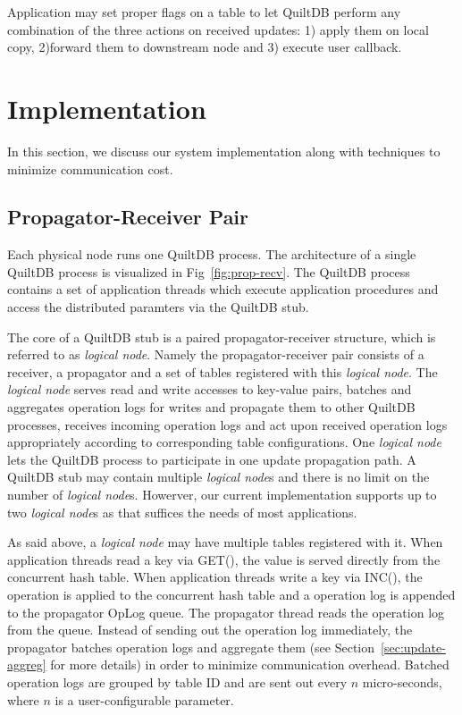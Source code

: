 \documentclass{acm_proc_article-sp}
\begin{document}
Application may set proper flags on a table to let QuiltDB perform any 
combination of the three actions on received updates: 1) apply them on local 
copy, 2)forward them to downstream node and 3) execute user callback.

\section{Implementation}
In this section, we discuss our system implementation along with techniques to 
minimize communication cost.

\subsection{Propagator-Receiver Pair}

Each physical node runs one QuiltDB process. The architecture of a single 
QuiltDB process is visualized in Fig~\ref{fig:prop-recv}.  The QuiltDB process
contains a set of application threads which execute application procedures and 
access the distributed paramters via the QuiltDB stub. 

The core of a QuiltDB stub is a paired propagator-receiver structure, which is 
referred to as \emph{logical node}. Namely the propagator-receiver pair consists
of a receiver, a propagator and a set of tables registered with this 
\emph{logical node}. The \emph{logical node} serves read and write accesses to 
key-value pairs, batches and aggregates operation logs for writes and propagate 
them to other QuiltDB processes, receives incoming operation logs and act upon 
received operation logs appropriately according to corresponding table 
configurations. One \emph{logical node} lets the QuiltDB process to participate 
in one update propagation path. A QuiltDB stub may contain multiple 
\emph{logical node}s and there is no limit on the number of \emph{logical 
node}s. Howerver, our current implementation supports up to two \emph{logical 
node}s as that suffices the needs of most applications.

As said above, a \emph{logical node} may have multiple tables registered with it. 
When application threads read a key via GET(), the value is served directly from
the concurrent hash table. When application threads write a key via INC(), the 
operation is applied to the concurrent hash table and a operation log is 
appended to the propagator OpLog queue. The propagator thread reads the 
operation log from the queue. Instead of sending out the operation log 
immediately, the propagator batches operation logs and aggregate them (see
Section~\ref{sec:update-aggreg} for more details) in order to minimize 
communication overhead. Batched operation logs are grouped by table ID and are
sent out every $n$ micro-seconds, where $n$ is a user-configurable parameter.
\end{document}
